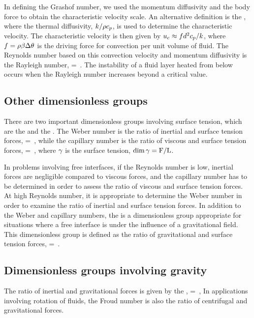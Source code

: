 In defining the Grashof number, we used the momentum diffusivity and the body force to obtain the characteristic velocity scale. An alternative definition is the , where the thermal diffusivity, $k/\rho c_p$, is used to determine the characteristic velocity. The characteristic velocity is then given by ${u}_{c}\approx fd^2c_p/k$, where $f = \rho\beta\Delta\theta$ is the driving force for convection per unit volume of fluid. The Reynolds number based on this convection velocity and momentum diffusivity is the Rayleigh number,
\beq
\krayleigh = \dfrac{\dens^2\kshcap_\press\diam^3\grav\kthexp\Dx\temp}{\dynvis\kthcond}\,.
\eeq
The  instability of a fluid layer heated from below occurs when the Rayleigh number increases beyond a critical value.


\subsection{Other dimensionless groups}
There are two important dimensionless groups involving surface tension, which are the  and the . The Weber number is the ratio of inertial and surface tension forces,
\beq
\kweber = \dfrac{\dens\vel^2\length}{\surftens}\,,
\eeq
while the capillary number is the ratio of viscous and surface tension forces,
\beq
\kcapillar = \dfrac{\dynvis\vel}{\surftens}\,,
\eeq
where $\gamma$ is the surface tension, $\dim\gamma = \text{F}/\text{L}$.

In problems involving free interfaces, if the Reynolds number is low, inertial forces are negligible compared to viscous forces, and the capillary number has to be determined in order to assess the ratio of viscous and surface tension forces. At high Reynolds number, it is appropriate to determine the Weber number in order to examine the ratio of inertial and surface tension forces. In addition to the Weber and capillary numbers, the  is a dimensionless group appropriate for situations where a free interface is under the influence of a gravitational field. This dimensionless group is defined as the ratio of gravitational and surface tension forces,
\beq
\kbond = \,.
\eeq


\subsection{Dimensionless groups involving gravity}
The ratio of inertial and gravitational forces is given by the ,
\beq
\kfroud = \,,
\eeq
In applications involving rotation of fluids, the Froud number is also the ratio of centrifugal and gravitational forces.


